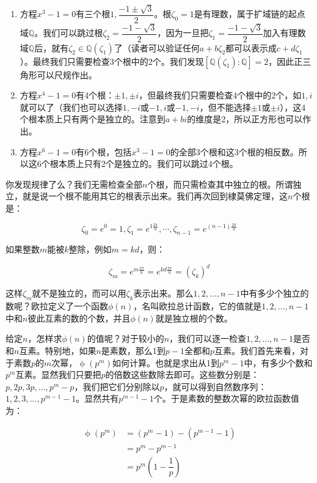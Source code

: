 \begin{enumerate}[(1)]
\item 方程$x^3 - 1 = 0$有三个根$1, \dfrac{-1 \pm \sqrt{3}}{2}$。根$\zeta_0 = 1$是有理数，属于扩域链的起点域$\mathbb{Q}$。我们可以跳过根$\zeta_2 = \dfrac{-1 - \sqrt{3}}{2}$，因为一旦把$\zeta_1 = \dfrac{-1 - \sqrt{3}}{2}$加入有理数域$\mathbb{Q}$后，就有$\zeta_2 \in \mathbb{Q}(\zeta_1)$了（读者可以验证任何$a + b \zeta_2$都可以表示成$c + d \zeta_1$）。最终我们只需要检查3个根中的2个。我们发现$[\mathbb{Q}(\zeta_1) : \mathbb{Q}] = 2$，因此正三角形可以尺规作出。

\item 方程$x^4 - 1 = 0$有4个根：$\pm 1, \pm i$，但最终我们只需要检查4个根中的2个，如$1, i$就可以了（我们也可以选择$1, -i$或$-1, i$或$-1, -i$，但不能选择$\pm 1$或$\pm i$），这4个根本质上只有两个是独立的。注意到$a + bi$的维度是2，所以正方形也可以作出。

\item 方程$x^6 - 1 = 0$有6个根，包括$x^3 - 1 = 0$的全部3个根和这3个根的相反数。所以这6个根本质上只有2个是独立的。我们可以跳过4个根。
\end{enumerate}

你发现规律了么？我们无需检查全部$n$个根，而只需检查其中独立的根。所谓独立，就是说一个根不能用其它的根表示出来。我们再次回到棣莫佛定理，这$n$个根是：

\[
\zeta_0 = e^0 = 1, \zeta_1 = e^{1\frac{2\pi}{n}}, \dotsb, \zeta_{n-1} = e^{(n - 1)\frac{2\pi}{n}}
\]

如果整数$m$能被$k$整除，例如$m = kd$，则：

\[
\zeta_m = e^{m\frac{2\pi}{n}} = e^{kd\frac{2\pi}{n}} = (\zeta_k)^d
\]

这样$\zeta_m$就不是独立的，而可以用$\zeta_k$表示出来。那么$1, 2, \dotsc, n-1$中有多少个独立的数呢？欧拉定义了一个函数$\phi(n)$，名叫欧拉总计函数，它的值就是$1, 2, \dotsc, n-1$中和$n$彼此互素的数的个数，并且$\phi(n)$就是独立根的个数。

给定$n$，怎样求$\phi(n)$的值呢？对于较小的$n$，我们可以逐一检查$1, 2, \dotsc, n - 1$是否和$n$互素。特别地，如果$n$是素数，那么1到$p-1$全都和$p$互素。我们首先来看，对于素数$p$的$m$次幂，$\upphi(p^m)$如何计算。也就是求出从1到$p^m-1$中，有多少个数和$p^m$互素。显然我们只要把$p$的倍数这些数除去即可。这些数分别是：$p, 2p, 3p, ..., p^m - p$，我们把它们分别除以$p$，就可以得到自然数序列：$1, 2, 3, ..., p^{m-1} - 1$。显然共有$p^{m-1} - 1$个。于是素数的整数次幂的欧拉函数值为：

\begin{align*}
\upphi(p^m) &= (p^m - 1) - (p^{m-1} - 1) \\
            &= p^m - p^{m-1} \\
            &= p^m(1-\dfrac{1}{p})
\end{align*}

